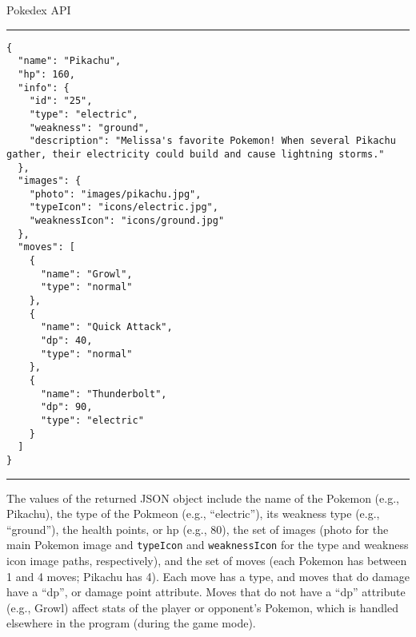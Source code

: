 \documentclass[programming]{../../../../mfcs}
\begin{document}
\begin{question}{Pokedex API}
\hrule
    \begin{lstlisting}
{
  "name": "Pikachu",
  "hp": 160,
  "info": {
    "id": "25",
    "type": "electric",
    "weakness": "ground",
    "description": "Melissa's favorite Pokemon! When several Pikachu gather, their electricity could build and cause lightning storms."
  },
  "images": {
    "photo": "images/pikachu.jpg",
    "typeIcon": "icons/electric.jpg",
    "weaknessIcon": "icons/ground.jpg"
  },
  "moves": [
    {
      "name": "Growl",
      "type": "normal"
    },
    {
      "name": "Quick Attack",
      "dp": 40,
      "type": "normal"
    },
    {
      "name": "Thunderbolt",
      "dp": 90,
      "type": "electric"
    }
  ]
}
\end{lstlisting}
\hrule
\vspace{1em}
The values of the returned JSON object include the name of the Pokemon (e.g., Pikachu), the type of
the Pokmeon (e.g., ``electric''), its weakness type (e.g., ``ground''), the health points, or hp
(e.g., 80), the set of images (photo for the main Pokemon image and \texttt{typeIcon} and
\texttt{weaknessIcon} for the type and weakness icon image paths, respectively), and the set of moves
(each Pokemon has between 1 and 4 moves; Pikachu has 4). Each move has a type, and moves that do
damage have a ``dp'', or damage point attribute. Moves that do not have a ``dp'' attribute (e.g.,
Growl) affect stats of the player or opponent's Pokemon, which is handled elsewhere in the program
(during the game mode).
\end{question}
\newpage
\end{document}
